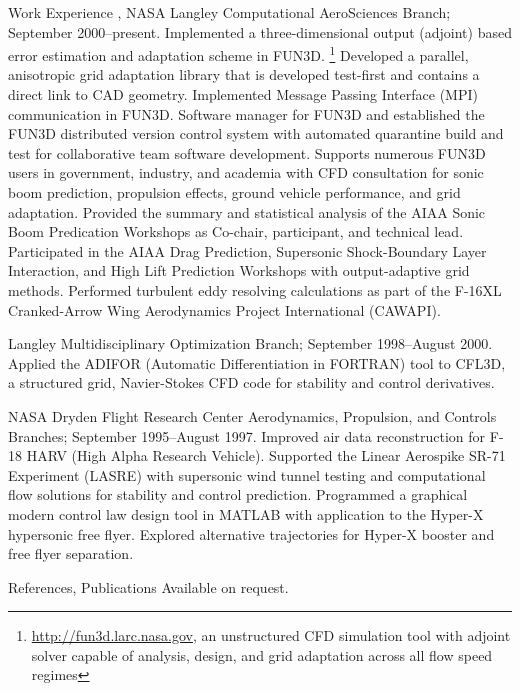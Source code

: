 \documentclass{resume}
\begin{document}
\begin{category}{Work Experience}
, NASA Langley Computational AeroSciences Branch;
September 2000--present.
Implemented a three-dimensional output (adjoint) based error
estimation and adaptation scheme in FUN3D.%
\footnote{\url{http://fun3d.larc.nasa.gov}, an unstructured CFD simulation tool with adjoint solver capable of analysis, design, and grid adaptation
across all flow speed regimes} 
Developed a parallel, anisotropic grid adaptation
library that is
developed test-first and contains a direct link to CAD geometry.
Implemented Message Passing Interface (MPI) communication in FUN3D.
Software manager for FUN3D and established the FUN3D distributed version 
control system with automated quarantine build and test
for collaborative team software development.
Supports numerous FUN3D users in government, industry, and academia with CFD
consultation for
sonic boom prediction, propulsion effects, ground vehicle performance,
and grid adaptation.
Provided the summary and statistical analysis of the
AIAA Sonic Boom Predication Workshops as Co-chair,
participant, and technical lead. 
Participated in the AIAA Drag Prediction,
Supersonic Shock-Boundary Layer Interaction,
and High Lift Prediction Workshops with output-adaptive grid methods.
Performed turbulent eddy resolving calculations as part of the F-16XL
Cranked-Arrow Wing Aerodynamics Project International (CAWAPI).

 Langley Multidisciplinary Optimization Branch;
September 1998--August 2000.
Applied the ADIFOR (Automatic Differentiation in FORTRAN) tool to
CFL3D, a structured grid, Navier-Stokes CFD code
for stability and control derivatives.

NASA Dryden Flight Research Center Aerodynamics, Propulsion, and Controls
Branches; September 1995--August 1997. 
Improved air data reconstruction for F-18 HARV (High Alpha
Research Vehicle). Supported the Linear Aerospike
SR-71 Experiment (LASRE) with supersonic wind tunnel testing and
computational flow solutions for stability and control prediction.
Programmed a graphical modern control law design tool in MATLAB with
application to the Hyper-X hypersonic free flyer.
Explored alternative trajectories for
Hyper-X booster and free flyer separation.


\end{category}


\begin{category}{References, Publications} 
\citemnobullet Available on request.
\end{category}
\end{document}
